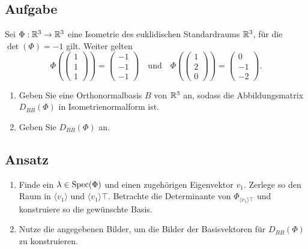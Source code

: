 \subsection{Aufgabe}
Sei \( \Phi: \mathbb{R}^3 \to \mathbb{R}^3 \) eine Isometrie des euklidischen Standardraums \( \mathbb{R}^3 \), für die \( \det(\Phi) = -1 \) gilt. Weiter gelten
\begin{equation*}
	\Phi\left( \left( \begin{smallmatrix}
		1 \\ 1 \\ 1
	\end{smallmatrix} \right) \right) = \left( \begin{smallmatrix}
		-1 \\ -1 \\ -1
	\end{smallmatrix} \right) \quad \text{und} \quad \Phi\left( \left( \begin{smallmatrix}
		1 \\ 2 \\ 0
	\end{smallmatrix} \right) \right) = \left( \begin{smallmatrix}
		0 \\ -1 \\ -2
	\end{smallmatrix} \right)\text{.}
\end{equation*}
\begin{enumerate}
	\item Geben Sie eine Orthonormalbasis \( B \) von \( \mathbb{R}^3 \) an, sodass die Abbildungsmatrix \( D_{BB}(\Phi) \) in Isometrienormalform ist.
	\item Geben Sie \( D_{BB}(\Phi) \) an. 
\end{enumerate}

\subsection{Ansatz}
\begin{enumerate}
	\item Finde ein \( \lambda \in \text{Spec}(\Phi) \) und einen zugehörigen Eigenvektor \( v_1 \). Zerlege so den Raum in \( \langle v_1 \rangle \) und \( \langle v_1 \rangle\top \). Betrachte die Determinante von \( \Phi_{\langle v_1 \rangle\top} \) und konstruiere so die gewünschte Basis.
	\item Nutze die angegebenen Bilder, um die Bilder der Basisvektoren für \( D_{BB}(\Phi) \) zu konstruieren. 
\end{enumerate}

